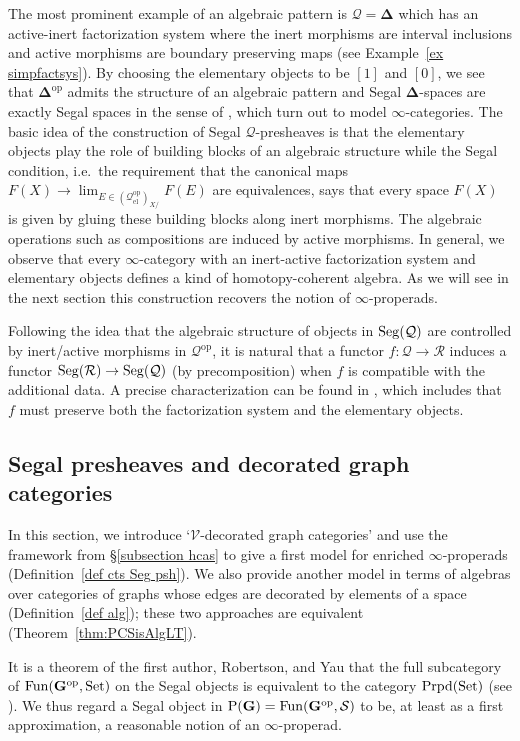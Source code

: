 \documentclass{amsart}
\numberwithin{theorem}{subsection}
\theoremstyle{definition}
\providecommand{\op}{\mathrm{op}}
\providecommand{\xel}{\mathrm{el}}
\newcommand{\xFun}{\operatorname{Fun}}
\newcommand{\xS}{\mathcal{S}}
\newcommand{\xV}{\mathcal{V}}
\newcommand{\Pre}{\name{P}}
\newcommand{\name}[1]{\ensuremath{\text{\textup{#1}}}}
\newcommand{\simp}{\mathbf{\Delta}}
\newcommand{\bbY}{\mathbf{G}}
\newcommand{\Set}{\name{Set}}
\newcommand{\Seg}{\name{Seg}}
\newcommand{\properads}{\name{Prpd}(\Set)}
\begin{document}
	The most prominent example of an algebraic pattern is $\mathcal Q=\simp$ which has an active-inert factorization system where the inert morphisms are interval inclusions and active morphisms are boundary preserving maps (see Example~\ref{ex simpfactsys}). 
	By choosing the elementary objects to be $[1]$ and $[0]$, we see that $\simp^\op$ admits the structure of an algebraic pattern and Segal $\simp$-spaces are exactly Segal spaces in the sense of \cite{Rezk}, which turn out to model $\infty$-categories. 
	The basic idea of the construction of Segal $\mathcal Q$-presheaves is that the elementary objects play the role of building blocks of an algebraic structure while the Segal condition, i.e.\ the requirement that the canonical maps $F(X)\to \lim_{E\in (\mathcal Q^\op_{\xel})_{X/}} F(E)$ are equivalences, says that every space $F(X)$ is given by gluing these building blocks along inert morphisms. 
	The algebraic operations such as compositions are induced by active morphisms. 
	In general, we observe that every $\infty$-category with an inert-active factorization system and elementary objects defines a kind of homotopy-coherent algebra. 
	As we will see in the next section this construction recovers the notion of $\infty$-properads.
	
	Following the idea that the algebraic structure of objects in $\Seg(\mathcal Q)$ are controlled by inert/active morphisms in $\mathcal Q^\op$, it is natural that a functor $f\colon \mathcal Q\to \mathcal R$ induces a functor $\Seg(\mathcal R)\to \Seg(\mathcal Q)$ (by precomposition) when $f$ is compatible with the additional data.
	A precise characterization can be found in \cite[Lemma 4.5]{patterns1}, which includes that $f$ must preserve both the factorization system and the elementary objects.


\subsection{Segal presheaves and decorated graph categories}\label{subsec DFV}
In this section, we introduce `$\xV$-decorated graph categories' and use the framework from \S\ref{subsection hcas} to give a first model for enriched $\infty$-properads (Definition~\ref{def cts Seg psh}). 
We also provide another model in terms of algebras over categories of graphs whose edges are decorated by elements of a space (Definition~\ref{def alg}); these two approaches are equivalent (Theorem~\ref{thm:PCSisAlgLT}).

It is a theorem of the first author, Robertson, and Yau that the full subcategory of $\xFun(\bbY^{\op},\Set)$ on the Segal objects is equivalent to the category $\properads$ (see \cite{hrybook}).
We thus regard a Segal object in $\Pre(\bbY) = \xFun(\bbY^{\op},\xS)$ to be, at least as a first approximation, a reasonable notion of an $\infty$-properad.
\end{document}
